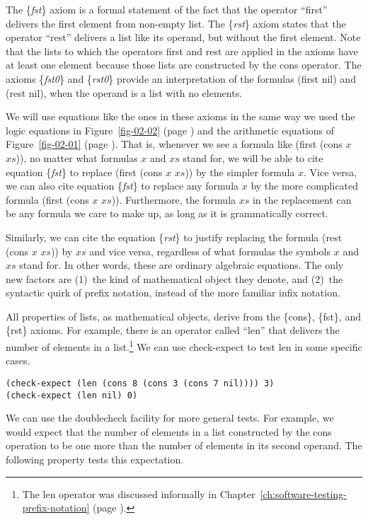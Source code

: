 The \{\emph{fst}\} axiom is a formal statement of the fact that
the operator ``first'' delivers the first element from non-empty list.
The \{\emph{rst}\} axiom states that the operator ``rest'' delivers
a list like its operand, but without the first element.
Note that the lists to which the operators first and rest
are applied in the axioms have at least one element
because those lists are constructed by the cons operator.
The axioms \{\emph{fst0}\} and \{\emph{rst0}\}
provide an interpretation of the formulas (first nil) and (rest nil),
when the operand is a list with no elements.

We will use equations like the ones in these axioms in the
same way we used the logic equations in Figure~\ref{fig-02-02}
(page \pageref{fig-02-02}) and the arithmetic equations of
Figure~\ref{fig-02-01} (page \pageref{fig-02-01}).
That is, whenever we see a formula like (first (cons $x$ $xs$)),
no matter what formulas $x$ and $xs$ stand for,
we will be able to cite equation \{\emph{fst}\} to replace
(first (cons $x$ $xs$)) by the simpler formula $x$.
Vice versa, we can also cite equation \{\emph{fst}\}
to replace any formula $x$ by the more complicated formula
(first (cons $x$ $xs$)).
Furthermore, the formula $xs$ in the replacement can be
any formula we care to make up, as long as it is grammatically correct.

Similarly, we can cite the equation \{\emph{rst}\} to justify
replacing the formula (rest (cons $x$ $xs$)) by $xs$
and vice versa, regardless of what formulas the symbols $x$ and $xs$ stand for.
In other words, these are ordinary algebraic equations.
The only new factors are
(1)~the kind of mathematical object they denote, and
(2)~the syntactic quirk of prefix notation, instead of the more familiar infix notation.

All properties of lists, as mathematical objects,
derive from the \{cons\}, \{fst\}, and \{rst\} axioms.
For example, there is an operator called ``len''
that delivers the number of elements in a list.\footnote{The
len operator was discussed informally in Chapter~\ref{ch:software-testing-prefix-notation}
(page \pageref{len-op-informal}).}
We can use check-expect to test len in some specific cases.

\begin{Verbatim}
(check-expect (len (cons 8 (cons 3 (cons 7 nil)))) 3)
(check-expect (len nil) 0)
\end{Verbatim}

We can use the doublecheck facility for more general tests.
For example, we would expect that the number of elements
in a list constructed by the cons operation to be
one more than the number of elements in its second operand.
The following property tests this expectation.

